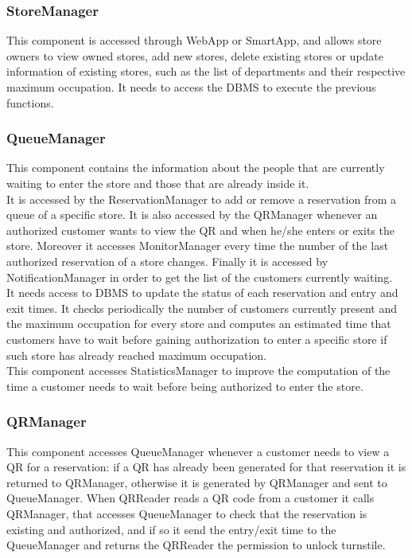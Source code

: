 \subsubsection{StoreManager}
This component is accessed through WebApp or SmartApp, and allows store owners to view owned stores, add new stores, delete existing stores or update information of existing stores, such as the list of departments and their respective maximum occupation. It needs to access the DBMS to execute the previous functions.
\subsubsection{QueueManager}
This component contains the information about the people that are currently waiting to enter the store and those that are already inside it.\\
It is accessed by the ReservationManager to add or remove a reservation from a queue of a specific store.
It is also accessed by the QRManager whenever an authorized customer wants to view the QR and when he/she enters or exits the store.
Moreover it accesses MonitorManager every time the number of the last authorized reservation of a store changes.
Finally it is accessed by NotificationManager in order to get the list of the customers currently waiting.\\
It needs access to DBMS to update the status of each reservation and entry and exit times. It checks periodically the number of customers currently present and the maximum occupation for every store and computes an estimated time that customers have to wait before gaining authorization to enter a specific store if such store has already reached maximum occupation.\\
This component accesses StatisticsManager to improve the computation of the time a customer needs to wait before being authorized to enter the store.
\subsubsection{QRManager}
This component accesses QueueManager whenever a customer needs to view a QR for a reservation: if a QR has already been generated for that reservation it is returned to QRManager, otherwise it is generated by QRManager and sent to QueueManager. When QRReader reads a QR code from a customer it calls QRManager, that accesses QueueManager to check that the reservation is existing and authorized, and if so it send the entry/exit time to the QueueManager and returns the QRReader the permission to unlock turnstile.
